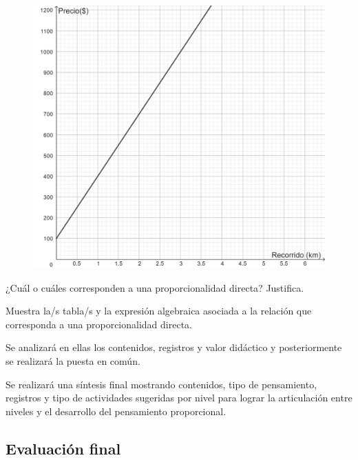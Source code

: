 \documentclass[oneside,spanish]{amsart}
\numberwithin{equation}{section}
\numberwithin{figure}{section}
\begin{document}
\begin{description}[itemsep=10pt]
\begin{figure}[ht]
\begin{minipage}[b]{0.3\linewidth}
        \label{fig:no-es-proporcionalidad-directa-2}
      \end{minipage}
      \hfill
      \begin{minipage}[b]{0.3\linewidth}
        \centering
        \includegraphics[width=\linewidth]{imagenes/no es proporcionalidad directa.png}
        \label{fig:no-es-proporcionalidad-directa}
      \end{minipage}
    \end{figure}

    ¿Cuál o cuáles corresponden a una proporcionalidad directa? Justifica.
    
    Muestra la/s tabla/s y la expresión algebraica asociada a la relación que corresponda a una proporcionalidad directa.
    
    Se analizará en ellas los contenidos, registros y valor didáctico y posteriormente se realizará la puesta en común.
    
    Se realizará una síntesis final mostrando contenidos, tipo de pensamiento, registros y tipo de actividades sugeridas por nivel para lograr la articulación entre niveles y el desarrollo del pensamiento proporcional.

    
\end{description}

 

\subsection{Evaluación final}
\end{document}
